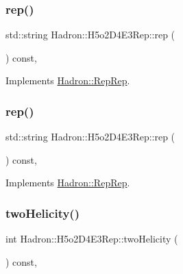 \subsubsection{\texorpdfstring{rep()}{rep()}\hspace{0.1cm}{\footnotesize\ttfamily [4/5]}}
{\footnotesize\ttfamily std\+::string Hadron\+::\+H5o2\+D4\+E3\+Rep\+::rep (\begin{DoxyParamCaption}{ }\end{DoxyParamCaption}) const\hspace{0.3cm}{\ttfamily [inline]}, {\ttfamily [virtual]}}



Implements \mbox{\hyperlink{structHadron_1_1RepRep_ab3213025f6de249f7095892109575fde}{Hadron\+::\+Rep\+Rep}}.

\mbox{\label{structHadron_1_1H5o2D4E3Rep_ab2c75db69668bb5a4d127992c3441ea4}} 
\subsubsection{\texorpdfstring{rep()}{rep()}\hspace{0.1cm}{\footnotesize\ttfamily [5/5]}}
{\footnotesize\ttfamily std\+::string Hadron\+::\+H5o2\+D4\+E3\+Rep\+::rep (\begin{DoxyParamCaption}{ }\end{DoxyParamCaption}) const\hspace{0.3cm}{\ttfamily [inline]}, {\ttfamily [virtual]}}



Implements \mbox{\hyperlink{structHadron_1_1RepRep_ab3213025f6de249f7095892109575fde}{Hadron\+::\+Rep\+Rep}}.

\mbox{\label{structHadron_1_1H5o2D4E3Rep_aafa508ed82fe94a7f52855aa9b8a4c74}} 
\subsubsection{\texorpdfstring{twoHelicity()}{twoHelicity()}\hspace{0.1cm}{\footnotesize\ttfamily [1/3]}}
{\footnotesize\ttfamily int Hadron\+::\+H5o2\+D4\+E3\+Rep\+::two\+Helicity (\begin{DoxyParamCaption}{ }\end{DoxyParamCaption}) const\hspace{0.3cm}{\ttfamily [inline]}, {\ttfamily [virtual]}}

